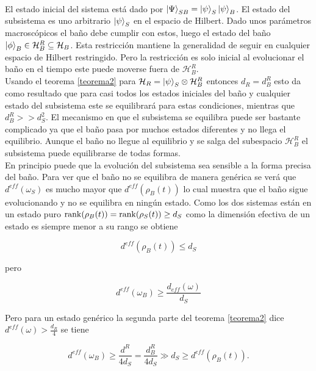 \\
El estado inicial del sistema está dado por $\ket{\Psi}_{SB}=\ket{\psi}_{S} \ket{\psi}_{B}$. El estado del subsistema es uno arbitrario $\ket{\psi}_{S}$ en el espacio de Hilbert. Dado unos parámetros macroscópicos el baño  debe cumplir con estos, luego el estado del baño $\ket{\phi}_{B} \in \mathcal{H}_{B}^{R} \subseteq \mathcal{H}_{B}$. Esta restricción mantiene la generalidad de seguir en cualquier espacio de Hilbert restringido. Pero la restricción es solo inicial al evolucionar el baño en el tiempo este puede moverse fuera de $\mathcal{H}_{B}^{R}$.
\\
Usando el teorema \ref{teorema2} para $\mathcal{H}_{R}= \ket{\psi}_{S} \otimes \mathcal{H}_{B}^{R}$ entonces $d_{R}=d_{B}^{R}$ esto da como resultado que para casi todos los estados iniciales del baño y cualquier estado del subsistema este se equilibrará para estas condiciones, mientras que $d_{B}^{R} >> d_{S}^{2}$. El mecanismo en que el subsistema se equilibra puede ser bastante complicado ya que el baño pasa por muchos estados diferentes y no llega el equilibrio. Aunque el baño no llegue al equilibrio y se salga del subespacio $\mathcal{H}_{B}^{R}$ el subsistema  puede equilibrarse de todas formas. 
\\
En principio puede que la evolución del subsistema sea sensible a la forma precisa del baño. Para ver que el baño no se equilibra de manera genérica se verá que $d^{eff}(\omega_{S})$ es mucho mayor que $d^{eff}(\rho_{B}(t))$ lo cual muestra que el baño sigue evolucionando y no se equilibra en ningún estado. Como los dos sistemas están en un estado puro $\rank(\rho_{B}(t))=\rank(\rho_{S}(t)) \geq d_{S}$ como la dimensión efectiva de un estado es siempre menor a su rango se obtiene 

\begin{equation}
d^{eff}(\rho_{B}(t)) \leq d_{S}
\end{equation}

pero 

\begin{equation}
d^{eff}(\omega_{B}) \geq \frac{d_{eff}(\omega)}{d_{S}}
\end{equation}

Pero para un estado genérico la segunda parte del teorema \ref{teorema2}  dice $d^{eff}(\omega) > \frac{d_{R}}{4}$ se tiene

\begin{equation}
d^{eff}(\omega_{B}) \geq \frac{d^{R}}{4d_{S}}=\frac{d_{B}^{R}}{4d_{S}} \gg d_{S} \geq d^{eff}(\rho_{B}(t)).
\end{equation}


